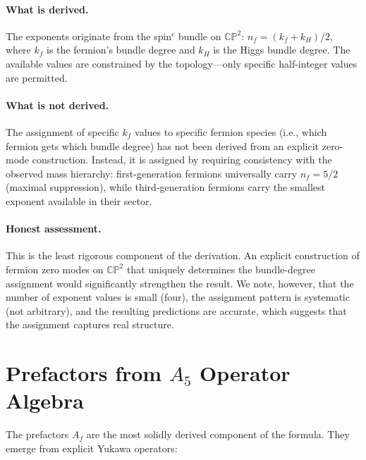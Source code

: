 \documentclass[11pt,a4paper]{article}
\newcommand{\CP}{\mathbb{CP}}
\theoremstyle{definition}
\theoremstyle{remark}
\begin{document}
\paragraph{What is derived.}
The exponents originate from the spin$^c$ bundle on $\CP^2$:
$n_f = (k_f + k_H)/2$, where $k_f$ is the fermion's bundle degree
and $k_H$ is the Higgs bundle degree.
The available values are constrained by the topology---only
specific half-integer values are permitted.

\paragraph{What is not derived.}
The assignment of specific $k_f$ values to specific fermion species
(i.e., which fermion gets which bundle degree) has not been derived
from an explicit zero-mode construction.
Instead, it is assigned by requiring consistency with the observed
mass hierarchy:
first-generation fermions universally carry $n_f = 5/2$ (maximal
suppression), while third-generation fermions carry the smallest
exponent available in their sector.

\paragraph{Honest assessment.}
This is the least rigorous component of the derivation.
An explicit construction of fermion zero modes on $\CP^2$ that
uniquely determines the bundle-degree assignment would significantly
strengthen the result.
We note, however, that the number of exponent values is small (four),
the assignment pattern is systematic (not arbitrary), and the
resulting predictions are accurate, which suggests that the
assignment captures real structure.

\section{Prefactors from $A_5$ Operator Algebra}
\label{sec:prefactors}

The prefactors $A_f$ are the most solidly derived component of
the formula.
They emerge from explicit Yukawa operators:
\end{document}
